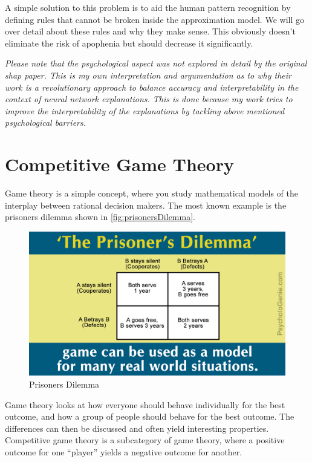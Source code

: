 \vspace{0.5cm}

A simple solution to this problem is to aid the human pattern recognition by defining rules that cannot be broken inside the approximation model. We will go over detail about these rules and why they make sense. This obviously doesn't eliminate the risk of apophenia but should decrease it significantly.

\vspace{1cm}

\textit{Please note that the psychological aspect was not explored in detail by the original shap paper. This is my own interpretation and argumentation as to why their work is a revolutionary approach to balance accuracy and interpretability in the context of neural network explanations. This is done because my work tries to improve the interpretability of the explanations by tackling above mentioned psychological barriers.}

\section{Competitive Game Theory}
\label{section:compGameTheory}

Game theory is a simple concept, where you study mathematical models of the interplay between rational decision makers. The most known example is the prisoners dilemma shown in \autoref{fig:prisonersDilemma}. 

\begin{figure}[H]
    \centering
    \includegraphics[width=\linewidth]{images/04_shap/Prisoners dilemma.png}
    \caption{Prisoners Dilemma \cite{psychologenie_2014}}
    \label{fig:prisonersDilemma}
\end{figure}

Game theory looks at how everyone should behave individually for the best outcome, and how a group of people should behave for the best outcome. The differences can then be discussed and often yield interesting properties. Competitive game theory is a subcategory of game theory, where a positive outcome for one \enquote{player} yields a negative outcome for another.

